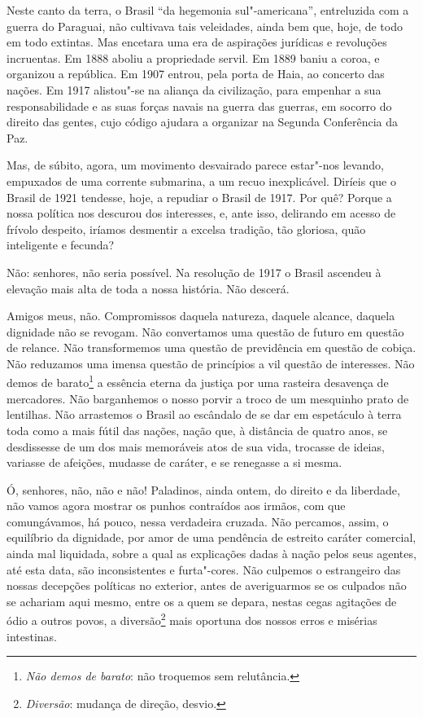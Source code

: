 Neste canto da terra, o Brasil ``da hegemonia
sul"-americana'', entreluzida com a guerra do Paraguai, não
cultivava tais veleidades, ainda bem que, hoje, de todo em todo
extintas. Mas encetara uma era de aspirações jurídicas e revoluções
incruentas. Em 1888 aboliu a propriedade servil. Em 1889 baniu a coroa, e organizou a
república. Em 1907 entrou, pela
porta de Haia, ao concerto das nações. Em 1917 alistou"-se na aliança da
civilização, para empenhar a sua responsabilidade e as suas forças
navais na guerra das guerras, em socorro do direito das gentes, cujo
código ajudara a organizar na Segunda Conferência da Paz.

Mas, de súbito, agora, um movimento desvairado parece estar"-nos
levando, empuxados de uma corrente submarina, a um recuo inexplicável.
Diríeis que o Brasil de 1921 tendesse, hoje, a repudiar o Brasil de
1917. Por quê? Porque a nossa política nos descurou dos interesses, e,
ante isso, delirando em acesso de frívolo despeito, iríamos desmentir a
excelsa tradição, tão gloriosa, quão inteligente e fecunda?

Não: senhores, não seria possível. Na resolução de 1917 o Brasil
ascendeu à elevação mais alta de toda a nossa história. Não descerá.

Amigos meus, não. Compromissos daquela natureza, daquele alcance,
daquela dignidade não se revogam. Não convertamos uma questão de futuro
em questão de relance. Não transformemos uma questão de previdência em
questão de cobiça. Não reduzamos uma imensa questão de princípios a vil
questão de interesses. Não demos de barato\footnote{\textit{Não demos de
barato}: não troquemos sem relutância.} a essência
eterna da justiça por uma rasteira desavença de mercadores. Não
barganhemos o nosso porvir a troco de um mesquinho prato de lentilhas.
Não arrastemos o Brasil ao escândalo de se dar em espetáculo à terra
toda como a mais fútil das nações, nação que, à distância de quatro
anos, se desdissesse de um dos mais memoráveis atos de sua vida,
trocasse de ideias, variasse de afeições, mudasse de caráter, e se
renegasse a si mesma.

Ó, senhores, não, não e não! Paladinos, ainda ontem, do direito e
da liberdade, não vamos agora mostrar os punhos contraídos aos irmãos,
com que comungávamos, há pouco, nessa verdadeira cruzada. Não percamos,
assim, o equilíbrio da dignidade, por amor de uma pendência de estreito
caráter comercial, ainda mal liquidada, sobre a qual as explicações
dadas à nação pelos seus agentes, até esta data, são inconsistentes e
furta"-cores. Não culpemos o estrangeiro das nossas decepções políticas
no exterior, antes de averiguarmos se os culpados não se achariam aqui
mesmo, entre os a quem se depara, nestas cegas agitações de ódio a
outros povos, a diversão\footnote{\textit{Diversão}: mudança de direção, desvio.} mais oportuna dos nossos erros e misérias intestinas.

